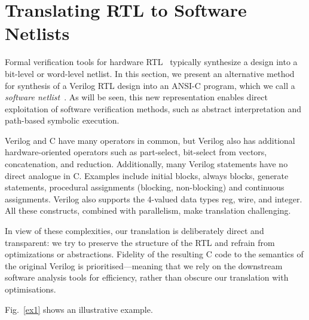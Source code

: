 \section{Translating RTL to Software Netlists}\label{sec:v2c}
%
Formal verification tools for hardware RTL~\cite{abc,DBLP:conf/fmcad/BradleyM07,vis} typically
synthesize a design into a bit-level or word-level netlist.  In this section, we
present an alternative method for synthesis of a Verilog RTL design into an ANSI-C program, which we
call a \textit{software netlist}~\cite{mkm2015,mtk2016}. As will be seen, this new representation 
enables direct exploitation of software verification methods, such as 
abstract interpretation and path-based symbolic execution.

Verilog and C have many operators in common, but  Verilog also has 
additional hardware-oriented operators such as part-select, bit-select from vectors, concatenation, and reduction. Additionally, many Verilog statements have no direct analogue in C. Examples include
initial blocks, always blocks, generate statements, procedural assignments
(blocking, non-blocking) and continuous assignments. Verilog also supports the 4-valued data types 
reg, wire, and integer.  All these constructs, combined with 
parallelism, make translation challenging.

In view of these complexities, our translation is deliberately direct and transparent: we try to preserve the structure of the RTL and refrain from optimizations or abstractions. Fidelity of the resulting C code to the semantics of the original Verilog is prioritised---meaning that we rely on the downstream software analysis tools for efficiency, rather than obscure our translation with optimisations. 

Fig.~\ref{ex1} shows an illustrative example. 

